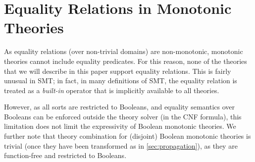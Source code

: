 \documentclass[runningheads]{llncs}
\begin{document}
\section{Equality Relations in Monotonic Theories\label{sec:equality}}

As equality relations (over non-trivial domains) are non-monotonic, monotonic theories cannot include equality predicates.
For this reason, none of the theories that we will describe in this paper support equality relations. This is fairly unusual in SMT; in fact, in many definitions of SMT\cite{sebastiani2007lazy,de2009satisfiability}, the equality relation is treated as a \textit{built-in} operator that is implicitly available to all theories.

However, as all sorts are restricted to Booleans, and equality semantics over Booleans can be enforced outside the theory solver (in the CNF formula), this limitation does not limit the expressivity of Boolean monotonic theories. We further note that theory combination for (disjoint) Boolean monotonic theories is trivial (once they have been transformed as in \autoref{sec:propagation}), as they are function-free and restricted to Booleans. 
\end{document}
